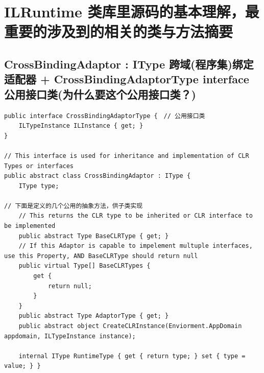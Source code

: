 \documentclass[9pt, b5paper]{article}
\begin{document}
\section{ILRuntime 类库里源码的基本理解，最重要的涉及到的相关的类与方法摘要}
\label{sec-13}
\subsection{CrossBindingAdaptor : IType 跨域(程序集)绑定适配器 + CrossBindingAdaptorType interface 公用接口类(为什么要这个公用接口类？)}
\label{sec-13-1}
\begin{verbatim}
public interface CrossBindingAdaptorType {　// 公用接口类
    ILTypeInstance ILInstance { get; }
}

// This interface is used for inheritance and implementation of CLR Types or interfaces
public abstract class CrossBindingAdaptor : IType {
    IType type;

// 下面是定义的几个公用的抽象方法，供子类实现    
    // This returns the CLR type to be inherited or CLR interface to be implemented
    public abstract Type BaseCLRType { get; }
    // If this Adaptor is capable to impelement multuple interfaces, use this Property, AND BaseCLRType should return null
    public virtual Type[] BaseCLRTypes {
        get {
            return null;
        }
    }
    public abstract Type AdaptorType { get; }
    public abstract object CreateCLRInstance(Enviorment.AppDomain appdomain, ILTypeInstance instance);

    internal IType RuntimeType { get { return type; } set { type = value; } }


\end{verbatim}
\end{document}

